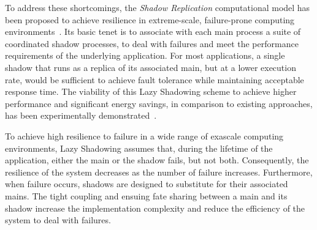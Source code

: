 To address these shortcomings, the {\it Shadow Replication} computational model %
has been proposed to achieve resilience in extreme-scale, failure-prone computing environments~\cite{mills2014energy,mills2014power,cui_en7085151}. Its basic tenet is to associate with each main process a suite of coordinated shadow processes, %
to deal with failures and meet the performance requirements of the underlying application. 
For most applications, %
a single shadow that runs as a replica of its associated main, but at a lower execution rate, would be sufficient to achieve fault tolerance while maintaining acceptable response time. 
The viability of this Lazy Shadowing scheme to achieve higher performance and significant energy savings, in comparison to existing approaches, has been experimentally demonstrated~\cite{cui_2016_scalcom}. 

To achieve high resilience to failure in a wide range of exascale computing environments, Lazy Shadowing assumes that, during the lifetime of the application, either the main or the shadow fails, but not both. Consequently, the resilience of the system decreases as the number of failure increases. Furthermore, when failure occurs, shadows are designed to substitute for their associated mains. The tight coupling and ensuing fate sharing between a main and its shadow increase the implementation complexity and reduce the efficiency of the system to deal with failures. 

